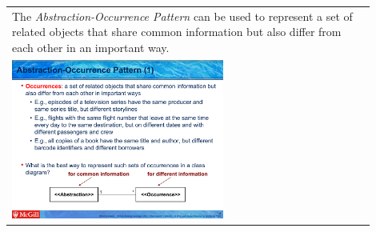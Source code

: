\begin{tabular}{|p{0.9\linewidth}}
The \textit{Abstraction-Occurrence Pattern} can be used to 
represent a set of related objects that share common information but also differ
from each other in an important way.

\\
\includegraphics[width=0.6\textwidth]{images/abstraction_occurrence.png}
\end{tabular} \medskip



